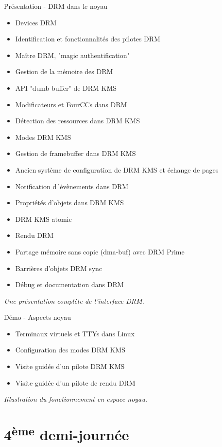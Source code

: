 \documentclass[a4paper,12pt,obeyspaces,spaces,hyphens]{article}
\begin{document}
\feagendatwocolumn
{Présentation - DRM dans le noyau}
{
  \begin{itemize}
  \item Devices DRM
  \item Identification et fonctionnalités des pilotes DRM
  \item Maître DRM, "magic authentification"
  \item Gestion de la mémoire des DRM
  \item API "dumb buffer" de DRM KMS
  \item Modificateurs et FourCCs dans DRM
  \item Détection des ressources dans DRM KMS
  \item Modes DRM KMS
  \item Gestion de framebuffer dans DRM KMS
  \item Ancien système de configuration de DRM KMS et échange de pages
  \item Notification d´évènements dans DRM
  \item Propriétés d'objets dans DRM KMS
  \item DRM KMS atomic
  \item Rendu DRM
  \item Partage mémoire sans copie (dma-buf) avec DRM Prime
  \item Barrières d'objets DRM sync
  \item Débug et documentation dans DRM
  \end{itemize}
  \vspace{0.5em}
  {\em Une présentation complète de l'interface DRM.}
}
{Démo - Aspects noyau}
{
  \begin{itemize}
  \item Terminaux virtuels et TTYs dans Linux
  \item Configuration des modes DRM KMS
  \item Visite guidée d'un pilote DRM KMS
  \item Visite guidée d'un pilote de rendu DRM
  \end{itemize}
  \vspace{0.5em}
  {\em Illustration du fonctionnement en espace noyau.}
}

\section{4\textsuperscript{ème} demi-journée}
\end{document}
